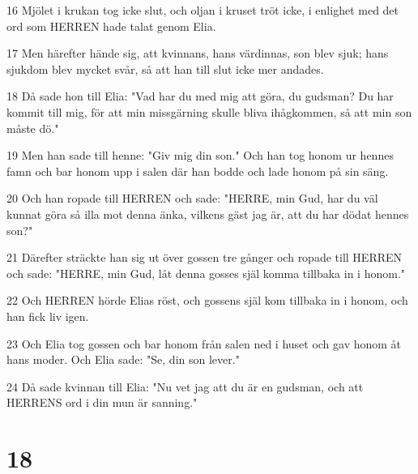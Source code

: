 \par 16 Mjölet i krukan tog icke slut, och oljan i kruset tröt icke, i enlighet med det ord som HERREN hade talat genom Elia.
\par 17 Men härefter hände sig, att kvinnans, hans värdinnas, son blev sjuk; hans sjukdom blev mycket svår, så att han till slut icke mer andades.
\par 18 Då sade hon till Elia: "Vad har du med mig att göra, du gudsman? Du har kommit till mig, för att min missgärning skulle bliva ihågkommen, så att min son måste dö."
\par 19 Men han sade till henne: "Giv mig din son." Och han tog honom ur hennes famn och bar honom upp i salen där han bodde och lade honom på sin säng.
\par 20 Och han ropade till HERREN och sade: "HERRE, min Gud, har du väl kunnat göra så illa mot denna änka, vilkens gäst jag är, att du har dödat hennes son?"
\par 21 Därefter sträckte han sig ut över gossen tre gånger och ropade till HERREN och sade: "HERRE, min Gud, låt denna gosses själ komma tillbaka in i honom."
\par 22 Och HERREN hörde Elias röst, och gossens själ kom tillbaka in i honom, och han fick liv igen.
\par 23 Och Elia tog gossen och bar honom från salen ned i huset och gav honom åt hans moder. Och Elia sade: "Se, din son lever."
\par 24 Då sade kvinnan till Elia: "Nu vet jag att du är en gudsman, och att HERRENS ord i din mun är sanning."

\chapter{18}

